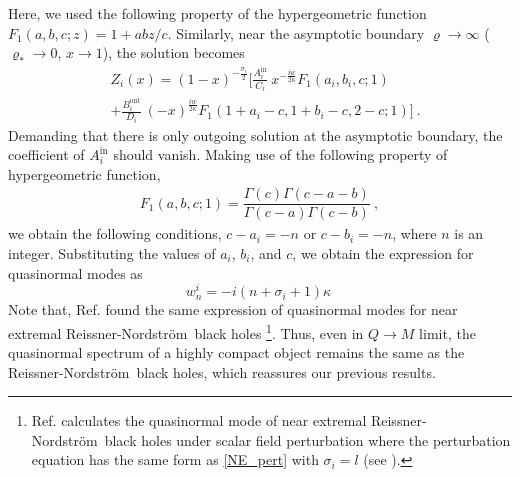 \documentclass[aps,prd,twocolumn,floatfix,noshowpacs,tightenlines,noshowkeys,superscriptaddress,amsmath,amssymb,
nofootinbib]{revtex4-1}
\renewcommand\[{\begin{equation}}
\renewcommand\]{\end{equation}}
\def\RN{Reissner-Nordstr\"{o}m}
\def\ro{\varrho}
\begin{document}
Here, we used the following property of the hypergeometric function $F_1(a,b,c;z)=1+abz/c$. Similarly, near the asymptotic boundary $\ro\to \infty$ ($\ro_{*} \to 0$, $x\to 1$), the solution becomes
\begin{equation}\label{NE_sol1}
	\begin{aligned}
		&Z_i(x)=(1-x)^{-\frac{\sigma_i}{2}}\bigg[\frac{A_i^{\textrm{in}}}{C_i}~x^{-\frac{i w}{2\kappa}}F_{1}(a_i,b_i,c;1)\\&+\frac{B_i^{\textrm{out}}}{D_i}~ (-x)^{\frac{i w}{2\kappa}}F_{1}(1+a_i-c,1+b_i-c,2-c;1)\bigg]~.
	\end{aligned}
\end{equation}
Demanding that there is only outgoing solution at the asymptotic boundary, the coefficient of $A_i^{\textrm{in}}$ should vanish. Making use of the following property of hypergeometric function,
\begin{equation}\label{hyper}
	\begin{aligned}
	F_{1}(a,b,c;1)=\dfrac{\Gamma(c)\Gamma(c-a-b)}{\Gamma(c-a)\Gamma(c-b)}~,
	\end{aligned}
\end{equation}
we obtain the following conditions, $c-a_i=-n$ or $c-b_i=-n$, where $n$ is an integer. Substituting the values of $a_i$, $b_i$, and $c$, we obtain the expression for quasinormal modes as 
\begin{equation}\label{NE_QNM}
		w^{i}_{n}=-i(n+\sigma_i+1)\kappa~
\end{equation}
Note that, Ref. \cite{Kim:2012mh,Chen:2012zn,Rahman:2018oso} found the same expression of quasinormal modes for near extremal \RN\ black holes \footnote{Ref. \cite{Kim:2012mh,Chen:2012zn,Rahman:2018oso} calculates the quasinormal mode of near extremal \RN\ black holes under scalar field perturbation where the perturbation equation has the same form as \autoref{NE_pert} with $\sigma_i=l$ (see \cite{Chen:2012zn}).}. Thus, even in $Q\to M$ limit,  the quasinormal spectrum of a highly compact object remains the same as the \RN\ black holes, which reassures our previous results.
\end{document}
